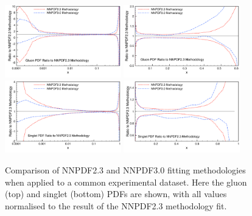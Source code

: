 \clearpage
\begin{figure}[!]
\centering
\includegraphics[width=0.45\textwidth]{7-PostLHC/figs/30meth/plots/glulog.pdf}
\includegraphics[width=0.45\textwidth]{7-PostLHC/figs/30meth/plots/glulin.pdf}\\
\includegraphics[width=0.45\textwidth]{7-PostLHC/figs/30meth/plots/snglog.pdf}
\includegraphics[width=0.45\textwidth]{7-PostLHC/figs/30meth/plots/snglin.pdf}

\caption[Comparison of NNPDF2.3 and NNPDF3.0 fitting methodologies when applied to a common experimental dataset. Gluon and singlet PDF combinations]{Comparison of NNPDF2.3 and NNPDF3.0 fitting methodologies when applied to a common experimental dataset. Here the gluon (top) and singlet (bottom) PDFs are shown, with all values normalised to the result of the NNPDF2.3 methodology fit.}
\label{fig:23vs30methodology_1}
\end{figure}

